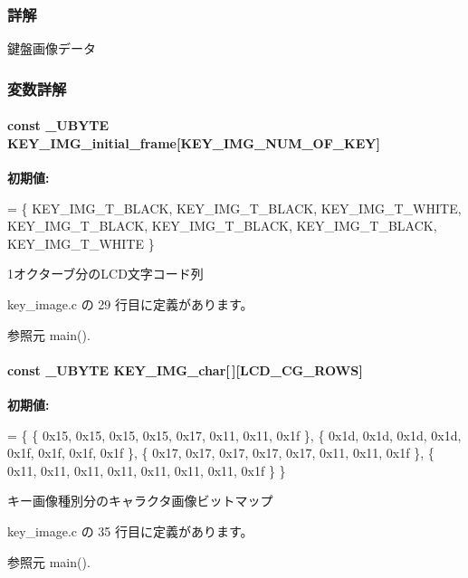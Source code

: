 \subsubsection{詳解}
鍵盤画像データ 

 

\subsubsection{変数詳解}
\paragraph[{K\+E\+Y\+\_\+\+I\+M\+G\+\_\+initial\+\_\+frame}]{\setlength{\rightskip}{0pt plus 5cm}const \+\_\+\+U\+B\+Y\+T\+E K\+E\+Y\+\_\+\+I\+M\+G\+\_\+initial\+\_\+frame\mbox{[}{\bf K\+E\+Y\+\_\+\+I\+M\+G\+\_\+\+N\+U\+M\+\_\+\+O\+F\+\_\+\+K\+E\+Y}\mbox{]}}\label{key__image_8c_aac267b2e32d4518bd2661895e8667365_aac267b2e32d4518bd2661895e8667365}
{\bfseries 初期値\+:}
\begin{DoxyCode}
= \{
    KEY_IMG_T_BLACK, KEY_IMG_T_BLACK, KEY_IMG_T_WHITE,
    KEY_IMG_T_BLACK, KEY_IMG_T_BLACK, KEY_IMG_T_BLACK,
    KEY\_IMG\_T\_WHITE
\}
\end{DoxyCode}


1オクターブ分の\+L\+C\+D文字コード列 



 key\+\_\+image.\+c の 29 行目に定義があります。



参照元 main().

\paragraph[{K\+E\+Y\+\_\+\+I\+M\+G\+\_\+char}]{\setlength{\rightskip}{0pt plus 5cm}const \+\_\+\+U\+B\+Y\+T\+E K\+E\+Y\+\_\+\+I\+M\+G\+\_\+char\mbox{[}$\,$\mbox{]}\mbox{[}L\+C\+D\+\_\+\+C\+G\+\_\+\+R\+O\+W\+S\mbox{]}}\label{key__image_8c_a232f4f540a0f671fb2f980064795d03b_a232f4f540a0f671fb2f980064795d03b}
{\bfseries 初期値\+:}
\begin{DoxyCode}
= \{
    \{ 0x15, 0x15, 0x15, 0x15, 0x17, 0x11, 0x11, 0x1f \},
    \{ 0x1d, 0x1d, 0x1d, 0x1d, 0x1f, 0x1f, 0x1f, 0x1f \},
    \{ 0x17, 0x17, 0x17, 0x17, 0x17, 0x11, 0x11, 0x1f \},
    \{ 0x11, 0x11, 0x11, 0x11, 0x11, 0x11, 0x11, 0x1f \}
\}
\end{DoxyCode}


キー画像種別分のキャラクタ画像ビットマップ 



 key\+\_\+image.\+c の 35 行目に定義があります。



参照元 main().

